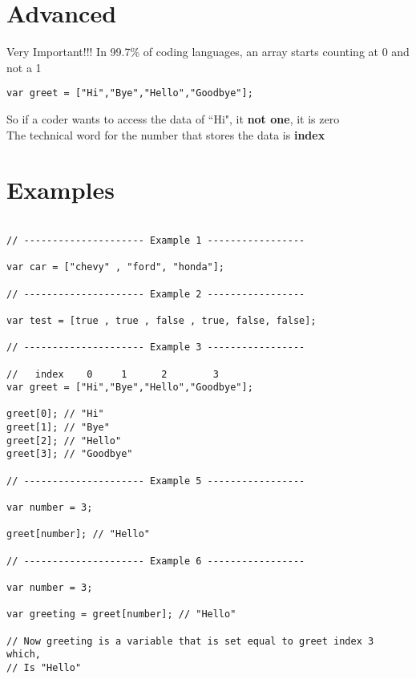 \documentclass[12pt, letterpaper]{article}
\begin{document}
\section*{Advanced}

Very Important!!! In 99.7\% of coding languages, an array starts counting at 0 and not a 1
\begin{lstlisting}
var greet = ["Hi","Bye","Hello","Goodbye"];
\end{lstlisting}
So if a coder wants to access the data of ``Hi", it \textbf{not one}, it is zero\\
The technical word for the number that stores the data is \textbf{index}

\section*{Examples}

\begin{lstlisting}

// --------------------- Example 1 -----------------

var car = ["chevy" , "ford", "honda"];

// --------------------- Example 2 -----------------

var test = [true , true , false , true, false, false];

// --------------------- Example 3 -----------------

//   index    0     1      2        3
var greet = ["Hi","Bye","Hello","Goodbye"];

greet[0]; // "Hi"
greet[1]; // "Bye"
greet[2]; // "Hello"
greet[3]; // "Goodbye"

// --------------------- Example 5 -----------------

var number = 3;

greet[number]; // "Hello"

// --------------------- Example 6 -----------------

var number = 3;

var greeting = greet[number]; // "Hello"

// Now greeting is a variable that is set equal to greet index 3 which, 
// Is "Hello"


\end{lstlisting}
\end{document}
